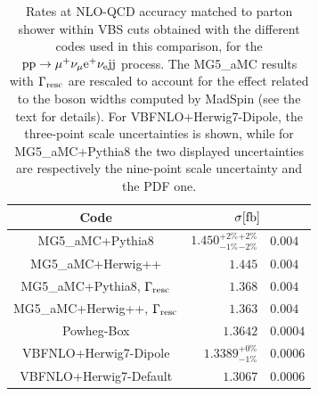\begin{table}[h!]
    \centering
    \begin{tabular}{c|r@{ $\pm$ }l}
      Code  &  \multicolumn{2}{c}{$\sigma[\rm{fb}]$}  \\
        \hline\hline
        {\sc MG5\_aMC}+{\sc Pythia8}&  $1.450 ^{+2\%}_{-1\%} {}^{+2\%}_{-2\%} $ & $0.004$  \\
        {\sc MG5\_aMC}+{\sc Herwig++}&  $1.445 $ & $0.004$  \\
        {\sc MG5\_aMC}+{\sc Pythia8}, $\Gamma_{\rm resc}$&  $1.368$ & $0.004$  \\
        {\sc MG5\_aMC}+{\sc Herwig++}, $\Gamma_{\rm resc}$&  $1.363$ & $0.004$  \\
        {\sc Powheg-Box}  & $1.3642$ & $0.0004$  \\
        {\sc VBFNLO}+{\sc Herwig7-Dipole} &  $1.3389 ^{+0\%}_{-1\%}$ & $0.0006$  \\
        {\sc VBFNLO}+{\sc Herwig7-Default} &  $1.3067$ & $0.0006$  \\
    \end{tabular}
    \caption{\label{tab:PSratesNLO} Rates at NLO-QCD  accuracy matched to parton shower within VBS cuts obtained with the different codes used in this comparison,
    for the ${\rm p}{\rm p}\to\mu^+\nu_\mu{\rm e}^+\nu_{\rm e}{\rm j}{\rm j}$ process. The {\sc MG5\_aMC} results with $\Gamma_{\rm resc}$ 
    are rescaled to account for the effect related to the boson widths computed by {\sc MadSpin} (see the text for details). For
    {\sc VBFNLO}+{\sc Herwig7-Dipole}, the three-point scale uncertainties is shown, while for  {\sc MG5\_aMC}+{\sc Pythia8} the two displayed uncertainties
are respectively the nine-point scale uncertainty and the PDF one.}
\end{table}

